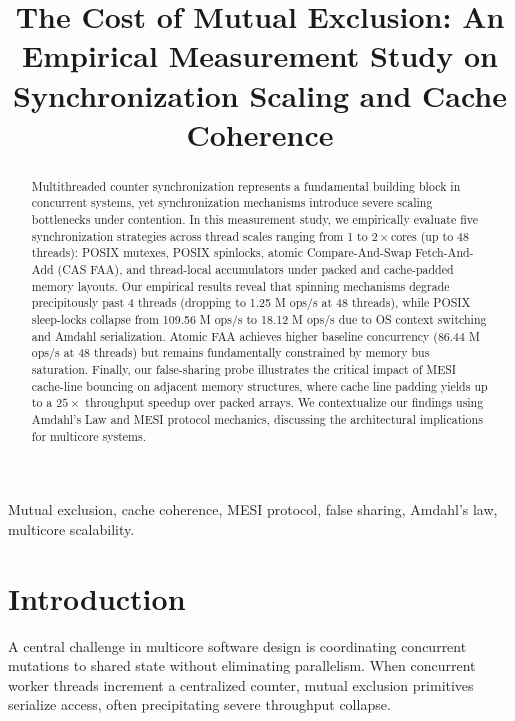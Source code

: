 \documentclass[conference]{IEEEtran}
\begin{document}
\title{The Cost of Mutual Exclusion: An Empirical Measurement Study on Synchronization Scaling and Cache Coherence}

\author{
}

\maketitle

\begin{abstract}
Multithreaded counter synchronization represents a fundamental building block in concurrent systems, yet synchronization mechanisms introduce severe scaling bottlenecks under contention. In this measurement study, we empirically evaluate five synchronization strategies across thread scales ranging from 1 to $2\times\text{cores}$ (up to 48 threads): POSIX mutexes, POSIX spinlocks, atomic Compare-And-Swap Fetch-And-Add (CAS FAA), and thread-local accumulators under packed and cache-padded memory layouts. Our empirical results reveal that spinning mechanisms degrade precipitously past 4 threads (dropping to 1.25 M ops/s at 48 threads), while POSIX sleep-locks collapse from 109.56 M ops/s to 18.12 M ops/s due to OS context switching and Amdahl serialization. Atomic FAA achieves higher baseline concurrency (86.44 M ops/s at 48 threads) but remains fundamentally constrained by memory bus saturation. Finally, our false-sharing probe illustrates the critical impact of MESI cache-line bouncing on adjacent memory structures, where cache line padding yields up to a $25\times$ throughput speedup over packed arrays. We contextualize our findings using Amdahl's Law and MESI protocol mechanics, discussing the architectural implications for multicore systems.
\end{abstract}

\begin{IEEEkeywords}
Mutual exclusion, cache coherence, MESI protocol, false sharing, Amdahl's law, multicore scalability.
\end{IEEEkeywords}

\section{Introduction}
A central challenge in multicore software design is coordinating concurrent mutations to shared state without eliminating parallelism. When concurrent worker threads increment a centralized counter, mutual exclusion primitives serialize access, often precipitating severe throughput collapse. 
\end{document}
